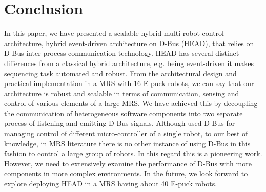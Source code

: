 \documentclass{ifacconf}
\begin{document}
\section{Conclusion}
\label{sec:conc}
In this paper, we have presented a scalable hybrid multi-robot control architecture, hybrid event-driven architecture on D-Bus (HEAD), that relies on D-Bus inter-process communication technology. HEAD has several distinct differences from a classical hybrid architecture, e.g. being event-driven it makes sequencing task automated and robust. From the architectural design and practical implementation in a MRS with 16 E-puck robots, we can say that our architecture is robust and scalable in terms of communication, sensing and control of various elements of a large MRS. We have achieved this by decoupling the communication of heterogeneous software components into two separate process of listening and emitting D-Bus signals.  Although \cite{Magnenat+2009} used D-Bus for managing control of different micro-controller of a single robot, to our best of knowledge, in MRS literature there is no other instance of using D-Bus in this fashion to control a large group of robots. In this regard this is a pioneering work. However, we need to extensively examine the performance of D-Bus with more components in more complex environments. In the future, we look forward to explore deploying HEAD in a MRS having about 40 E-puck robots.


                                                   

\end{document}
